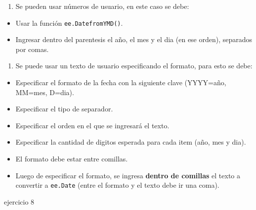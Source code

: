 \documentclass[
]{article}
\providecommand{\tightlist}{%
  \setlength{\itemsep}{0pt}\setlength{\parskip}{0pt}}
\begin{document}
\begin{enumerate}
\def\labelenumi{\arabic{enumi}.}
\setcounter{enumi}{1}
\tightlist
\item
  Se pueden usar números de usuario, en este caso se debe:
\end{enumerate}

\begin{itemize}
\tightlist
\item
  Usar la función \texttt{ee.DatefromYMD()}.
\item
  Ingresar dentro del parentesis el año, el mes y el dia (en ese orden),
  separados por comas.
\end{itemize}

\begin{enumerate}
\def\labelenumi{\arabic{enumi}.}
\setcounter{enumi}{2}
\tightlist
\item
  Se puede usar un texto de usuario especificando el formato, para esto
  se debe:
\end{enumerate}

\begin{itemize}
\tightlist
\item
  Especificar el formato de la fecha con la siguiente clave (YYYY=año,
  MM=mes, D=dia).
\item
  Especificar el tipo de separador.
\item
  Especificar el orden en el que se ingresará el texto.
\item
  Especificar la cantidad de digitos esperada para cada item (año, mes y
  dia).
\item
  El formato debe estar entre comillas.
\item
  Luego de especificar el formato, se ingresa \textbf{dentro de
  comillas} el texto a convertir a \texttt{ee.Date} (entre el formato y
  el texto debe ir una coma).
\end{itemize}

ejercicio 8
\end{document}
